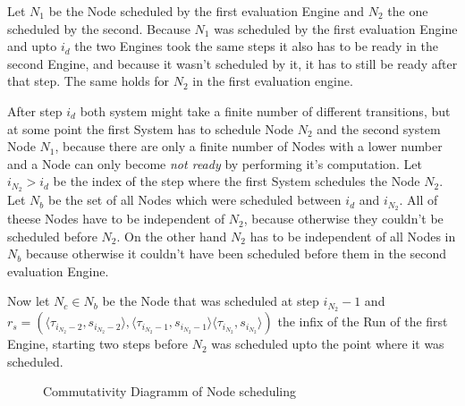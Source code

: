 Let \(N_1\) be the Node scheduled by the first evaluation Engine and \(N_2\) the one scheduled by the second.
Because \(N_1\) was scheduled by the first evaluation Engine and upto \(i_d\) the two Engines took the same steps it also has to be ready in the second Engine, and because it wasn't scheduled by it, it has to still be ready after that step.
The same holds for \(N_2\) in the first evaluation engine.

After step \(i_d\) both system might take a finite number of different transitions, but at some point the first System has to schedule Node \(N_2\) and the second system Node \(N_1\), because there are only a finite number of Nodes with a lower number and a Node can only become \emph{not ready} by performing it's computation.
Let \(i_{N_2} > i_d\) be the index of the step where the first System schedules the Node \(N_2\).
Let \(N_b\) be the set of all Nodes which were scheduled between \(i_d\) and \(i_{N_2}\).
All of theese Nodes have to be independent of \(N_2\), because otherwise they couldn't be scheduled before \(N_2\). %
On the other hand \(N_2\) has to be independent of all Nodes in \(N_b\) because otherwise it couldn't have been scheduled before them in the second evaluation Engine.

Now let \(N_c \in N_b\) be the Node that was scheduled at step \(i_{N_2} - 1\) and
\(r_s = (\langle \tau_{i_{N_2} - 2}, s_{i_{N_2} - 2}\rangle, \langle\tau_{i_{N_2} - 1}, s_{i_{N_2} - 1}\rangle \langle\tau_{i_{N_2}}, s_{i_{N_2}}\rangle)\)
the infix of the Run of the first Engine, starting two steps before \(N_2\) was scheduled upto the point where it was scheduled.

\begin{figure}
  \caption{Commutativity Diagramm of Node scheduling}
\label{fig:chap3:sec_sync:commutativity_scheduling}
\end{figure}

